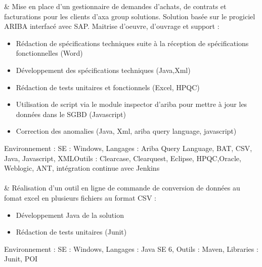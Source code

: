 
& Mise en place d'un gestionnaire de demandes d'achats, de contrats et facturations pour les clients d'axa group solutions. Solution basée sur le progiciel ARIBA interfacé avec SAP. Maitrise d'oeuvre, d'ouvrage et support :%
\begin{itemize}%
\item Rédaction de spécifications techniques suite à la réception de spécifications fonctionnelles (Word)
\item Développement des spécifications techniques (Java,Xml)
\item Rédaction de tests unitaires et fonctionnels (Excel, HPQC)
\item Utilisation de script via le module inspector d'ariba pour mettre à jour les données dans le SGBD (Javascript)
\item Correction des anomalies (Java, Xml, ariba query language, javascript)
\end{itemize}%
Environnement : SE : Windows, Langages : Ariba Query Language, BAT, CSV, Java, Javascript, XMLOutils : Clearcase, Clearquest, Eclipse, HPQC,Oracle, Weblogic, ANT, intégration continue avec Jenkins\\\\
& Réalisation d'un outil en ligne de commande de conversion de données au fomat excel en plusieurs fichiers au format CSV : %
\begin{itemize}%
\item Développement Java de la solution
\item Rédaction de tests unitaires (Junit)
\end{itemize}%
Environnement : SE : Windows, Langages : Java SE 6, Outils : Maven, Libraries : Junit, POI
